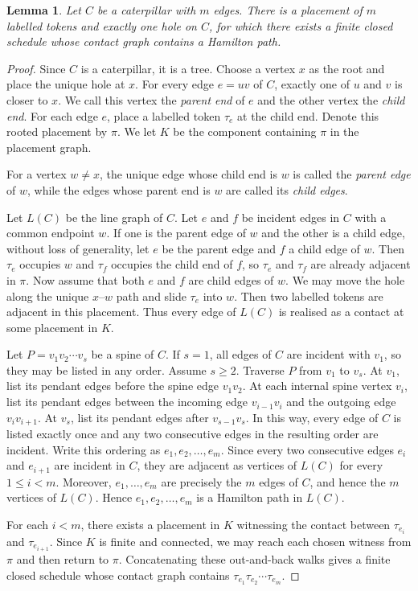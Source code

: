 \documentclass[11pt]{article}
\newtheorem{lemma}[theorem]{Lemma}
\theoremstyle{remark}
\numberwithin{equation}{section}
\begin{document}
\begin{lemma}\label{lem:caterpillar}
Let $C$ be a caterpillar with $m$ edges. There is a placement of $m$ labelled tokens and exactly one hole on $C$, for which there exists a finite closed schedule whose contact graph contains a Hamilton path.
\end{lemma}

\begin{proof}
Since $C$ is a caterpillar, it is a tree. Choose a vertex $x$ as the root and place the unique hole at $x$. For every edge $e=uv$ of $C$, exactly one of $u$ and $v$ is closer to $x$. We call this vertex the \emph{parent end} of $e$ and the other vertex the \emph{child end}. For each edge $e$, place a labelled token $\tau_e$ at the child end.  Denote this rooted placement by $\pi$. We let $K$ be the component containing $\pi$ in the placement graph.

For a vertex $w\neq x$, the unique edge whose child end is $w$ is called the \emph{parent edge} of $w$, while the edges whose parent end is $w$ are called its \emph{child edges}.

Let $L(C)$ be the line graph of $C$. Let $e$ and $f$ be incident edges in $C$ with a common endpoint $w$. If one is the parent edge of $w$ and the other is a child edge, without loss of generality, let $e$ be the parent edge and $f$ a child edge of $w$. Then $\tau_e$ occupies $w$ and $\tau_f$ occupies the child end of $f$, so $\tau_e$ and $\tau_f$ are already adjacent in $\pi$. Now assume that both $e$ and $f$ are child edges of $w$. We may move the hole along the unique $x$--$w$ path and slide $\tau_e$ into $w$. Then two labelled tokens are adjacent in this placement. Thus every edge of $L(C)$ is realised as a contact at some placement in $K$.

Let $P=v_1v_2\cdots v_s$ be a spine of $C$. If $s=1$, all edges of $C$ are incident with $v_1$, so they may be listed in any order. Assume $s\geq2$. Traverse $P$ from $v_1$ to $v_s$. At $v_1$, list its pendant edges before the spine edge $v_1v_2$. At each internal spine vertex $v_i$, list its pendant edges between the incoming edge $v_{i-1}v_i$ and the outgoing edge $v_iv_{i+1}$. At $v_s$, list its pendant edges after $v_{s-1}v_s$. In this way, every edge of $C$ is listed exactly once and any two consecutive edges in the resulting order are incident. Write this ordering as $e_1,e_2,\ldots,e_m.$ Since every two consecutive edges $e_i$ and $e_{i+1}$ are incident in $C$, they are adjacent as vertices of $L(C)$ for every $1\leq i<m$. Moreover, $e_1,\ldots,e_m$ are precisely the $m$ edges of $C$, and hence the $m$ vertices of $L(C)$. Hence $e_1,e_2,\ldots,e_m$ is a Hamilton path in $L(C)$.

For each $i<m$, there exists a placement in $K$ witnessing the contact between $\tau_{e_i}$ and $\tau_{e_{i+1}}$. Since $K$ is finite and connected, we may reach each chosen witness from $\pi$ and then return to $\pi$. Concatenating these out-and-back walks gives a finite closed schedule whose contact graph contains $\tau_{e_1}\tau_{e_2}\cdots\tau_{e_m}$.
\end{proof}
\end{document}
